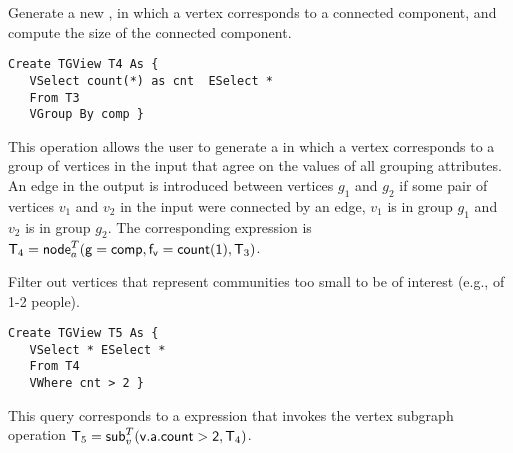 

\begin{example}
\label{ex:nodecra}

Generate a new \tg, in which a vertex corresponds to a connected
component, and compute the size of the connected component.  

\begin{small} 
\begin{verbatim}
Create TGView T4 As { 
   VSelect count(*) as cnt  ESelect *
   From T3
   VGroup By comp }
\end{verbatim}
\end{small}

\end{example}
\vspace{-0.07in}

This operation allows the user to generate a \tg in which a vertex
corresponds to a group of vertices in the input that agree on the
values of all grouping attributes.  An edge in the output is
introduced between vertices $g_1$ and $g_2$ if some pair of vertices
$v_1$ and $v_2$ in the input \tg were connected by an edge, $v_1$ is
in group $g_1$ and $v_2$ is in group $g_2$.  The corresponding \tga expression is
$\mathsf{T}_4 =
\textsf{node}^T_a(\mathsf{g=comp,f_v=count(1)},\mathsf{T}_3)$. 

\begin{example}
\label{ex:subg}
\vspace{-0.1cm}

Filter out vertices that represent communities too small to be of
interest (e.g., of 1-2 people).  

\begin{small} 
\begin{verbatim}
Create TGView T5 As {
   VSelect * ESelect *
   From T4
   VWhere cnt > 2 }
\end{verbatim}
\vspace{-0.1cm}
\end{small}

This query corresponds to a \tga expression that invokes the vertex
subgraph operation $\mathsf{T}_5 = \textsf{sub}^T_v(\mathsf{v.a.count > 2},\mathsf{T}_4)$.

\vspace{-0.1cm}
\end{example}

